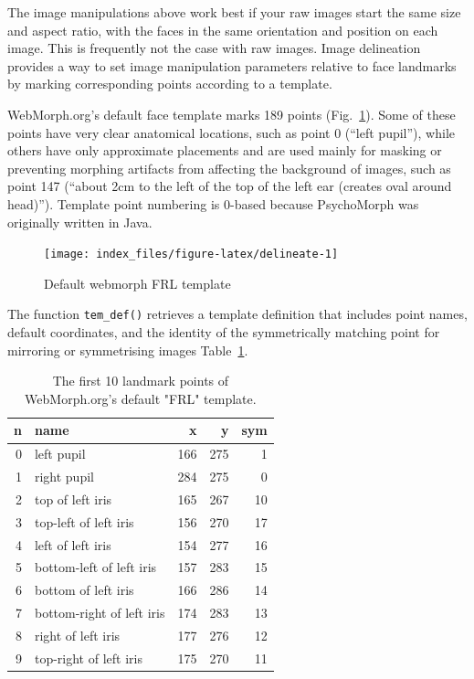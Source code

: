 \documentclass[
  man,floatsintext]{apa6}
\begin{document}
The image manipulations above work best if your raw images start the same size and aspect ratio, with the faces in the same orientation and position on each image. This is frequently not the case with raw images. Image delineation provides a way to set image manipulation parameters relative to face landmarks by marking corresponding points according to a template.

WebMorph.org's default face template marks 189 points (Fig.~\ref{fig:delineate}). Some of these points have very clear anatomical locations, such as point 0 (``left pupil''), while others have only approximate placements and are used mainly for masking or preventing morphing artifacts from affecting the background of images, such as point 147 (``about 2cm to the left of the top of the left ear (creates oval around head)''). Template point numbering is 0-based because PsychoMorph was originally written in Java.

\begin{figure}
\texttt{[image: index\_files/figure-latex/delineate-1]} \caption{Default webmorph FRL template}\label{fig:delineate}
\end{figure}

The function \texttt{tem\_def()} retrieves a template definition that includes point names, default coordinates, and the identity of the symmetrically matching point for mirroring or symmetrising images Table~\ref{tab:tem-def}.

\begin{table}

\caption{\label{tab:tem-def}The first 10 landmark points of WebMorph.org's default "FRL" template.}
\centering
\begin{tabular}[t]{r|l|r|r|r}
\hline
n & name & x & y & sym\\
\hline
0 & left pupil & 166 & 275 & 1\\
\hline
1 & right pupil & 284 & 275 & 0\\
\hline
2 & top of left iris & 165 & 267 & 10\\
\hline
3 & top-left of left iris & 156 & 270 & 17\\
\hline
4 & left of left iris & 154 & 277 & 16\\
\hline
5 & bottom-left of left iris & 157 & 283 & 15\\
\hline
6 & bottom of left iris & 166 & 286 & 14\\
\hline
7 & bottom-right of left iris & 174 & 283 & 13\\
\hline
8 & right of left iris & 177 & 276 & 12\\
\hline
9 & top-right of left iris & 175 & 270 & 11\\
\hline
\end{tabular}
\end{table}
\end{document}
